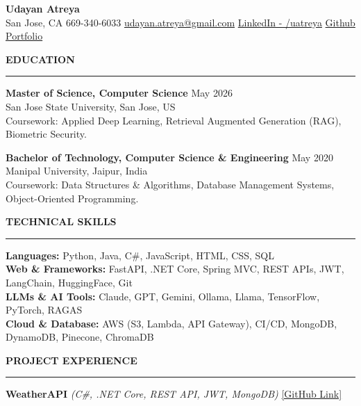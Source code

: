 \documentclass[letterpaper,10.5pt]{extarticle}
\newcommand{\resumesection}[1]{%
    \vspace{6pt}%
    \noindent\textbf{#1}\vspace{-5pt}%
    \\\noindent\rule{\textwidth}{0.5pt}%
    \vspace{1pt}%
}
\begin{document}
\begin{center}
    {\LARGE\textbf{Udayan Atreya}}\\[3pt]
    {\fontsize{11}{13.2}\selectfont
    San Jose, CA \textbar{} 669-340-6033 \textbar{}
    \href{mailto:udayan.atreya@gmail.com}{udayan.atreya@gmail.com} \textbar{}
    \href{https://www.linkedin.com/in/uatreya/}{LinkedIn - /uatreya} \textbar{}
    \href{https://github.com/slowloris-98/}{Github} \textbar{}
    \href{https://udayan-atreya.vercel.app/}{Portfolio}}
\end{center}

\resumesection{EDUCATION}

\noindent\textbf{Master of Science, Computer Science} \hfill May 2026\\
San Jose State University, San Jose, US\\
Coursework: Applied Deep Learning, Retrieval Augmented Generation (RAG), Biometric Security.

\vspace{5pt}

\noindent\textbf{Bachelor of Technology, Computer Science \& Engineering} \hfill May 2020\\
Manipal University, Jaipur, India\\
Coursework: Data Structures \& Algorithms, Database Management Systems, Object-Oriented Programming.

\resumesection{TECHNICAL SKILLS}

\noindent\textbf{Languages:} Python, Java, C\#, JavaScript, HTML, CSS, SQL\\
\noindent\textbf{Web \& Frameworks:} FastAPI, .NET Core, Spring MVC, REST APIs, JWT, LangChain, HuggingFace, Git\\
\noindent\textbf{LLMs \& AI Tools:} Claude, GPT, Gemini, Ollama, Llama, TensorFlow, PyTorch, RAGAS\\
\noindent\textbf{Cloud \& Database:} AWS (S3, Lambda, API Gateway), CI/CD, MongoDB, DynamoDB, Pinecone, ChromaDB

\resumesection{PROJECT EXPERIENCE}

\noindent\textbf{WeatherAPI} \textit{(C\#, .NET Core, REST API, JWT, MongoDB)} \hfill \href{https://github.com/slowloris-98/WeatherAPI}{[GitHub Link]}
\end{document}
